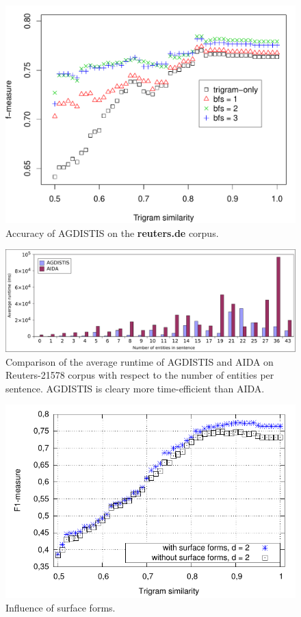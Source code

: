 \documentclass[11pt,letterpaper]{article}
\begin{document}
\begin{figure}[htb!]    
    \centering  
         \includegraphics[width=\linewidth]{fig/reuters.pdf}
    \caption{Accuracy of AGDISTIS on the \textbf{reuters.de} corpus.}\label{fig:reuters} 
\end{figure}
\begin{figure}[htb!]    
    \centering  
         \includegraphics[width=\linewidth]{fig/runtimes.pdf}
    \caption{Comparison of the average runtime of AGDISTIS and AIDA on Reuters-21578 corpus with respect to the number of entities per sentence. AGDISTIS is cleary more time-efficient than AIDA.}\label{fig:runtimeVSentities} 
\end{figure}

\begin{figure}[htb!]    
    \centering  
         \includegraphics[width=\linewidth]{fig/surface.pdf}
    \caption{Influence of surface forms.} 
\end{figure}
\end{document}
